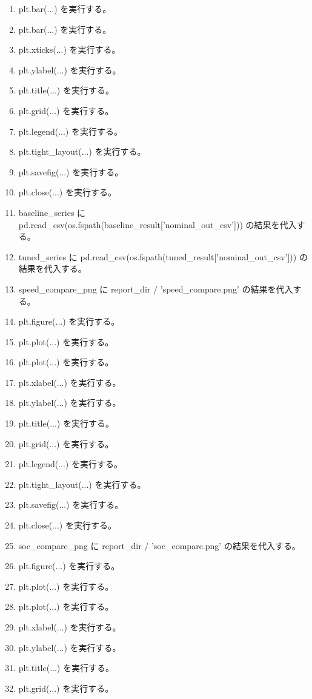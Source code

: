 \documentclass[a4paper,11pt]{article}
\begin{document}
\begin{enumerate}[leftmargin=1.8em]
\item plt.bar(...) を実行する。
\item plt.bar(...) を実行する。
\item plt.xticks(...) を実行する。
\item plt.ylabel(...) を実行する。
\item plt.title(...) を実行する。
\item plt.grid(...) を実行する。
\item plt.legend(...) を実行する。
\item plt.tight\_layout(...) を実行する。
\item plt.savefig(...) を実行する。
\item plt.close(...) を実行する。
\item baseline\_series に pd.read\_csv(os.fspath(baseline\_result['nominal\_out\_csv'])) の結果を代入する。
\item tuned\_series に pd.read\_csv(os.fspath(tuned\_result['nominal\_out\_csv'])) の結果を代入する。
\item speed\_compare\_png に report\_dir / 'speed\_compare.png' の結果を代入する。
\item plt.figure(...) を実行する。
\item plt.plot(...) を実行する。
\item plt.plot(...) を実行する。
\item plt.xlabel(...) を実行する。
\item plt.ylabel(...) を実行する。
\item plt.title(...) を実行する。
\item plt.grid(...) を実行する。
\item plt.legend(...) を実行する。
\item plt.tight\_layout(...) を実行する。
\item plt.savefig(...) を実行する。
\item plt.close(...) を実行する。
\item soc\_compare\_png に report\_dir / 'soc\_compare.png' の結果を代入する。
\item plt.figure(...) を実行する。
\item plt.plot(...) を実行する。
\item plt.plot(...) を実行する。
\item plt.xlabel(...) を実行する。
\item plt.ylabel(...) を実行する。
\item plt.title(...) を実行する。
\item plt.grid(...) を実行する。

\end{enumerate}
\end{document}
